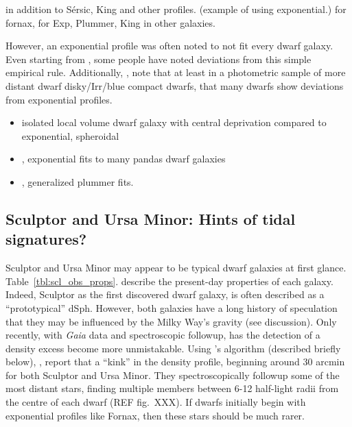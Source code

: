 in addition to Sérsic, King and other profiles. \citet{lelli+2014}
(example of using exponential.) \citet{wang+2019} for fornax,
\citet{mcconnachie+irwin2006} for Exp, Plummer, King in other galaxies.

However, an exponential profile was often noted to not fit every dwarf
galaxy. Even starting from \citet{aparicio1997}, some people have noted
deviations from this simple empirical rule. Additionally,
\citet{herrmann+hunter+elmegreen2013},
\citet{herrmann+hunter+elmegreen2016} note that at least in a
photometric sample of more distant dwarf disky/Irr/blue compact dwarfs,
that many dwarfs show deviations from exponential profiles.

\begin{itemize}
\tightlist
\item
  \citet{makarov+2012} isolated local volume dwarf galaxy with central
  deprivation compared to exponential, spheroidal
\item
  \citet{martin+2016}, exponential fits to many pandas dwarf galaxies
\item
  \citet{moskowitz+walker2020}, generalized plummer fits.
\end{itemize}

\subsection{Sculptor and Ursa Minor: Hints of tidal
signatures?}\label{sculptor-and-ursa-minor-hints-of-tidal-signatures}

Sculptor and Ursa Minor may appear to be typical dwarf galaxies at first
glance. Table~\ref{tbl:scl_obs_props}. describe the present-day
properties of each galaxy. Indeed, Sculptor as the first discovered
dwarf galaxy, is often described as a ``prototypical'' dSph. However,
both galaxies have a long history of speculation that they may be
influenced by the Milky Way's gravity (see discussion). Only recently,
with \emph{Gaia} data and spectroscopic followup, has the detection of a
density excess become more unmistakable. Using \citet{jensen+2024}'s
algorithm (described briefly below), \citet{sestito+2023a},
\citet{sestito+2023b} report that a ``kink'' in the density profile,
beginning around 30 arcmin for both Sculptor and Ursa Minor. They
spectroscopically followup some of the most distant stars, finding
multiple members between 6-12 half-light radii from the centre of each
dwarf (REF fig.~XXX). If dwarfs initially begin with exponential
profiles like Fornax, then these stars should be much rarer.

